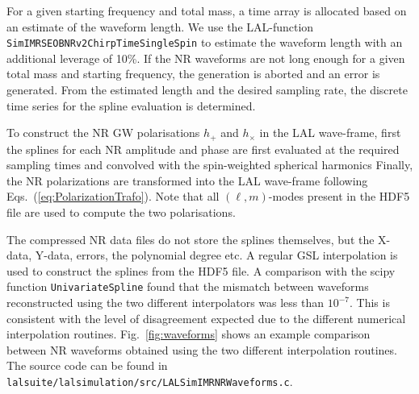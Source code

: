 \documentclass[11pt,tightenlines,article,amssymb,amsmath,amsfonts,superscriptaddress,nofootinbib]{revtex4}
\begin{document}
For a given starting frequency and total mass, a time array is allocated based on an estimate of the waveform length. We use the LAL-function 
\texttt{SimIMRSEOBNRv2ChirpTimeSingleSpin} to estimate the waveform length with an additional leverage of 10\%. If the NR waveforms are not long enough for a given total mass and starting frequency, the generation is aborted and an error is generated. From the estimated length and the desired sampling rate, the discrete time series for the spline evaluation is determined.

To construct the NR GW polarisations $h_+$ and $h_\times$ in the LAL
wave-frame, first the splines for each NR amplitude and phase are
first evaluated at the required sampling times and convolved with the
spin-weighted spherical harmonics
Finally, the NR polarizations are transformed into the LAL wave-frame following Eqs.~(\ref{eq:PolarizationTrafo}). Note that all $(\ell, m)$-modes present in the HDF5 file are used
to compute the two polarisations. 

The compressed NR data files do not store the splines themselves, but the X-data, Y-data, errors, the polynomial degree etc.  A regular GSL interpolation
is used to construct the splines from the HDF5 file. A comparison with the
scipy function \texttt{UnivariateSpline} found that the mismatch between
waveforms reconstructed using the two different interpolators was less than
$10^{-7}$. This is consistent with the level of disagreement expected due to the different numerical interpolation routines. Fig.~\ref{fig:waveforms}
shows an example comparison between NR waveforms obtained using the two
different interpolation routines.
The source code can be found in \texttt{lalsuite/lalsimulation/src/LALSimIMRNRWaveforms.c}.


\end{document}

